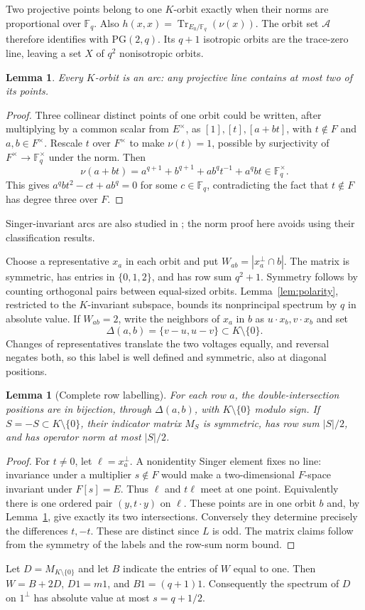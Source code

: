 \documentclass[11pt]{article}
\newtheorem{lemma}[theorem]{Lemma}
\theoremstyle{definition}
\newcommand{\F}{\mathbb F}
\newcommand{\PG}{\mathrm{PG}}
\newcommand{\Tr}{\operatorname{Tr}}
\begin{document}
Two projective points belong to one $K$-orbit exactly when their norms are proportional over $\F_q$. Also $h(x,x)=\Tr_{E_0/\F_q}(\nu(x))$. The orbit set $\mathcal A$ therefore identifies with $\PG(2,q)$. Its $q+1$ isotropic orbits are the trace-zero line, leaving a set $X$ of $q^2$ nonisotropic orbits.
\begin{lemma}\label{lem:arc}
Every $K$-orbit is an arc: any projective line contains at most two of its points.
\end{lemma}
\begin{proof}
Three collinear distinct points of one orbit could be written, after multiplying by a common scalar from $E^\times$, as $[1],[t],[a+bt]$, with $t\notin F$ and $a,b\in F^\times$. Rescale $t$ over $F^\times$ to make $\nu(t)=1$, possible by surjectivity of $F^\times\to\F_q^\times$ under the norm. Then
\[
\nu(a+bt)=a^{q+1}+b^{q+1}+ab^qt^{-1}+a^qbt\in\F_q^\times.
\]
This gives $a^qbt^2-ct+ab^q=0$ for some $c\in\F_q$, contradicting the fact that $t\notin F$ has degree three over $F$.
\end{proof}
Singer-invariant arcs are also studied in \cite{Kestenband,StormeVM}; the norm proof here avoids using their classification results.

Choose a representative $x_a$ in each orbit and put $W_{ab}=|x_a^\perp\cap b|$. The matrix is symmetric, has entries in $\{0,1,2\}$, and has row sum $q^2+1$. Symmetry follows by counting orthogonal pairs between equal-sized orbits. Lemma~\ref{lem:polarity}, restricted to the $K$-invariant subspace, bounds its nonprincipal spectrum by $q$ in absolute value. If $W_{ab}=2$, write the neighbors of $x_a$ in $b$ as $u\cdot x_b,v\cdot x_b$ and set
\[
\Delta(a,b)=\{v-u,u-v\}\subset K\setminus\{0\}.
\]
Changes of representatives translate the two voltages equally, and reversal negates both, so this label is well defined and symmetric, also at diagonal positions.
\begin{lemma}[Complete row labelling]\label{lem:labels}
For each row $a$, the double-intersection positions are in bijection, through $\Delta(a,b)$, with $K\setminus\{0\}$ modulo sign. If $S=-S\subset K\setminus\{0\}$, their indicator matrix $M_S$ is symmetric, has row sum $|S|/2$, and has operator norm at most $|S|/2$.
\end{lemma}
\begin{proof}
For $t\ne0$, let $\ell=x_a^\perp$. A nonidentity Singer element fixes no line: invariance under a multiplier $s\notin F$ would make a two-dimensional $F$-space invariant under $F[s]=E$. Thus $\ell$ and $t\ell$ meet at one point. Equivalently there is one ordered pair $(y,t\cdot y)$ on $\ell$. These points are in one orbit $b$ and, by Lemma~\ref{lem:arc}, give exactly its two intersections. Conversely they determine precisely the differences $t,-t$. These are distinct since $L$ is odd. The matrix claims follow from the symmetry of the labels and the row-sum norm bound.
\end{proof}
Let $D=M_{K\setminus\{0\}}$ and let $B$ indicate the entries of $W$ equal to one. Then $W=B+2D$, $D1=m1$, and $B1=(q+1)1$. Consequently the spectrum of $D$ on $1^\perp$ has absolute value at most $s=q+1/2$.
\end{document}
